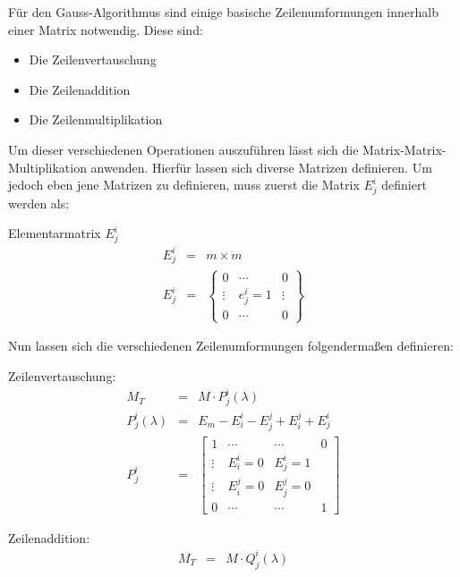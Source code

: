 
Für den Gauss-Algorithmus sind einige basische Zeilenumformungen innerhalb einer Matrix notwendig. Diese sind:

\begin{itemize}
\item Die Zeilenvertauschung
\item Die Zeilenaddition
\item Die Zeilenmultiplikation
\end{itemize}

Um dieser verschiedenen Operationen auszuführen lässt sich die Matrix-Matrix-Multiplikation anwenden. Hierfür lassen sich diverse Matrizen definieren.
Um jedoch eben jene Matrizen zu definieren, muss zuerst die Matrix $E^i_j$ definiert werden als:

\begin{Def} Elementarmatrix $E^i_j$
\begin{eqnarray}
	E^i_j &=& m \times m \\
 	E^i_j &=& 
	 	\begin{Bmatrix}
	 	0 & \cdots & 0 \\
	 	\vdots & e^i_j = 1 & \vdots \\
	 	0 & \cdots & 0 
 	\end{Bmatrix}
\end{eqnarray}
\end{Def}

Nun lassen sich die verschiedenen Zeilenumformungen folgendermaßen definieren:

\begin{Def} Zeilenvertauschung:
\begin{eqnarray}
	M_T &=& M \cdot P_j^i(\lambda) \\
	P_j^i(\lambda) &=& E_m - E^i_i - E^j_j + E^j_i + E^i_j \\
	P^i_j &=& \begin{bmatrix}
	1 & \cdots & \cdots & 0 \\ 
	\vdots & E^i_i = 0 & E^i_j = 1 &  \\ 
	\vdots & E^j_i = 0 & E^j_j = 0 &  \\ 
	0 & \cdots & \cdots & 1
	\end{bmatrix} 
\end{eqnarray}
\end{Def}

\begin{Def} Zeilenaddition:
\begin{eqnarray}
M_T &=& M \cdot Q^i_j(\lambda) 
\end{eqnarray}
\end{Def}